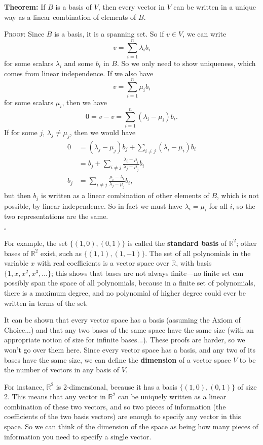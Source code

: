 \documentclass{article}
\newcommand{\qed}{{}\par\hfill$\square$\bigskip}
\begin{document}
\textbf{Theorem:}
If $B$ is a basis of $V$, then every vector in $V$ can be written in a unique way as a linear combination of elements of $B$.\medskip

\textsc{Proof:}
Since $B$ is a basis, it is a spanning set. So if $v\in V$, we can write
\[v=\sum_{i=1}^n \lambda_i b_i\]
for some scalars $\lambda_i$ and some $b_i$ in $B$. So we only need to show uniqueness, which comes from linear independence. If we also have
\[v=\sum_{i=1}^n \mu_ib_i\]
for some scalars $\mu_i$, then we have
\[0=v-v=\sum_{i=1}^n (\lambda_i-\mu_i)b_i.\]
If for some $j$, $\lambda_j\neq \mu_j$, then we would have
\begin{align*}
	0&=(\lambda_j-\mu_j)b_j + \sum_{i\neq j} (\lambda_i-\mu_i)b_i\\
	&=b_j+\sum_{i\neq j}\frac{\lambda_i-\mu_i}{\lambda_j-\mu_j}b_i\\
	b_j&=\sum_{i\neq j}\frac{\mu_i-\lambda_i}{\lambda_j-\mu_j}b_i,
\end{align*}
but then $b_j$ is written as a linear combination of other elements of $B$, which is not possible, by linear independence. So in fact we must have $\lambda_i=\mu_i$ for all $i$, so the two representations are the same.\qed



For example, the set $\{(1,0),(0,1)\}$ is called the \textbf{standard basis} of $\mathbb{R}^2$; other bases of $\mathbb{R}^2$ exist, such as $\{(1,1),(1,-1)\}$. The set of all polynomials in the variable $x$ with real coefficients is a vector space over $\mathbb{R}$, with basis $\{1,x,x^2,x^3,\hdots\}$; this shows that bases are not always finite---no finite set can possibly span the space of all polynomials, because in a finite set of polynomials, there is a maximum degree, and no polynomial of higher degree could ever be written in terms of the set.

It can be shown that every vector space has a basis (assuming the Axiom of Choice...) and that any two bases of the same space have the same size (with an appropriate notion of size for infinite bases...). These proofs are harder, so we won't go over them here. Since every vector space has a basis, and any two of its bases have the same size, we can define the \textbf{dimension} of a vector space $V$ to be the number of vectors in any basis of $V$.

For instance, $\mathbb{R}^2$ is 2-dimensional, because it has a basis $\{(1,0),(0,1)\}$ of size 2. This means that any vector in $\mathbb{R}^2$ can be uniquely written as a linear combination of these two vectors, and so two pieces of information (the coefficients of the two basis vectors) are enough to specify any vector in this space. So we can think of the dimension of the space as being how many pieces of information you need to specify a single vector.
\end{document}

